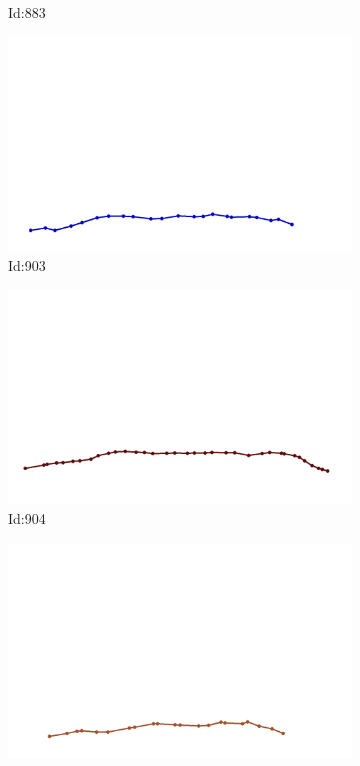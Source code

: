 \documentclass[12pt,twoside]{report}
\begin{document}
\begin{figure}
\begin{subfigure}[b]{0.20\textwidth}
\caption{Id:883}
\end{subfigure}
\begin{subfigure}[b]{0.20\textwidth}
\centering
\includegraphics[width=\textwidth]{../trajectories/903.png}
\caption{Id:903}
\end{subfigure}
\begin{subfigure}[b]{0.20\textwidth}
\centering
\includegraphics[width=\textwidth]{../trajectories/904.png}
\caption{Id:904}
\end{subfigure}
\begin{subfigure}[b]{0.20\textwidth}
\centering
\includegraphics[width=\textwidth]{../trajectories/915.png}

\end{subfigure}
\end{figure}
\end{document}
